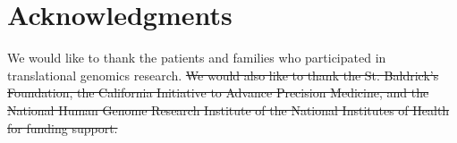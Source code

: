 \documentclass[10pt,letterpaper]{article}
\providecommand{\DIFdeltex}[1]{{\protect\color{red}\sout{#1}}}                      %
\providecommand{\DIFaddbegin}{} %
\providecommand{\DIFaddend}{} %
\providecommand{\DIFdelbegin}{} %
\providecommand{\DIFdelend}{} %
\providecommand{\DIFdel}[1]{\texorpdfstring{\DIFdeltex{#1}}{}} %
\newcommand{\DIFscaledelfig}{0.5}
\newlength{\DIFdelgraphicswidth} %
\newlength{\DIFdelgraphicsheight} %
\newcommand{\DIFaddincludegraphics}[2][]{{\color{blue}\fbox{\DIFOincludegraphics[#1]{#2}}}} %
\newcommand{\DIFdelincludegraphics}[2][]{%
\sbox{\DIFdelgraphicsbox}{\DIFOincludegraphics[#1]{#2}}%
\settoboxwidth{\DIFdelgraphicswidth}{\DIFdelgraphicsbox} %
\settoboxtotalheight{\DIFdelgraphicsheight}{\DIFdelgraphicsbox} %
\scalebox{\DIFscaledelfig}{%
\parbox[b]{\DIFdelgraphicswidth}{\usebox{\DIFdelgraphicsbox}\\[-\baselineskip] \rule{\DIFdelgraphicswidth}{0em}}\llap{\resizebox{\DIFdelgraphicswidth}{\DIFdelgraphicsheight}{%
\setlength{\unitlength}{\DIFdelgraphicswidth}%
\begin{picture}(1,1)%
\thicklines\linethickness{2pt} %
{\color[rgb]{1,0,0}\put(0,0){\framebox(1,1){}}}%
{\color[rgb]{1,0,0}\put(0,0){\line( 1,1){1}}}%
{\color[rgb]{1,0,0}\put(0,1){\line(1,-1){1}}}%
\end{picture}%
}\hspace*{3pt}}} %
} %
\DeclareRobustCommand{\DIFaddbegin}{\DIFOaddbegin \let\includegraphics\DIFaddincludegraphics} %
\DeclareRobustCommand{\DIFaddend}{\DIFOaddend \let\includegraphics\DIFOincludegraphics} %
\DeclareRobustCommand{\DIFdelbegin}{\DIFOdelbegin \let\includegraphics\DIFdelincludegraphics} %
\DeclareRobustCommand{\DIFdelend}{\DIFOaddend \let\includegraphics\DIFOincludegraphics} %
\begin{document}
\section*{Acknowledgments}
We would like to thank the patients and families who participated in translational genomics research.
\DIFdelbegin \DIFdel{We would also like to thank the St. Baldrick's Foundation, the California Initiative to Advance Precision Medicine, and the National Human Genome Research Institute of the National Institutes of Health for funding support.
}\DIFdelend 

\nolinenumbers

%
%
%

\DIFaddbegin 
\DIFaddend %

\end{document}
